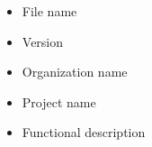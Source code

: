 \documentclass[11pt]{article}
\begin{document}
	\begin{itemize}
		\item File name
		\item Version
		\item Organization name
		\item Project name                                                                                                                                                                                                                                                                                                                                                                                                                                                                                                                                                                                                                                                                                                                                                                                                                                                                                                                                                                                                                                                                                                                                                                                                                                                                                                                                                                                                                                                                                                                                                                                                                                                                                                                                                                                                                                                                                                                                                                                                                                                                                                                                                                                                                                                                                                                                                                                                                                                                         
		\item Functional description
	\end{itemize}
	
\end{document}
